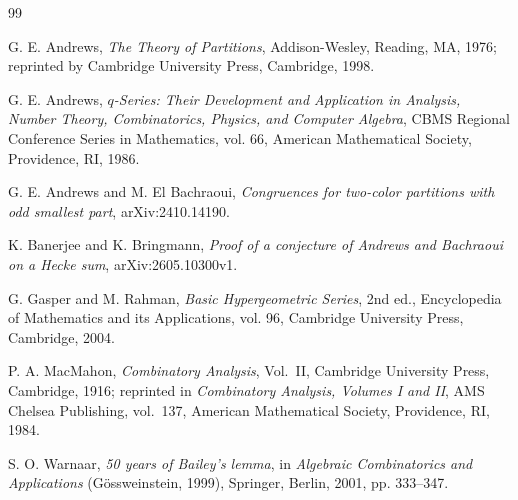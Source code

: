 \documentclass[11pt]{amsart}
\theoremstyle{remark}
\begin{document}
\begin{thebibliography}{99}

G. E. Andrews, \emph{The Theory of Partitions}, Addison-Wesley, Reading, MA, 1976; reprinted by Cambridge University Press, Cambridge, 1998.

G. E. Andrews, \emph{$q$-Series: Their Development and Application in Analysis,
Number Theory, Combinatorics, Physics, and Computer Algebra}, CBMS Regional
Conference Series in Mathematics, vol. 66, American Mathematical Society,
Providence, RI, 1986.

G. E. Andrews and M. El Bachraoui, \emph{Congruences for two-color partitions with odd smallest part}, arXiv:2410.14190.

K. Banerjee and K. Bringmann, \emph{Proof of a conjecture of Andrews and Bachraoui on a Hecke sum}, arXiv:2605.10300v1.

G. Gasper and M. Rahman, \emph{Basic Hypergeometric Series}, 2nd ed., Encyclopedia of Mathematics and its Applications, vol. 96, Cambridge University Press, Cambridge, 2004.

P. A. MacMahon, \emph{Combinatory Analysis}, Vol.~II, Cambridge University Press, Cambridge, 1916; reprinted in \emph{Combinatory Analysis, Volumes I and II}, AMS Chelsea Publishing, vol.~137, American Mathematical Society, Providence, RI, 1984.

S. O. Warnaar, \emph{50 years of Bailey's lemma}, in \emph{Algebraic
Combinatorics and Applications} (G\"ossweinstein, 1999), Springer, Berlin,
2001, pp. 333--347.

\end{thebibliography}
\end{document}
